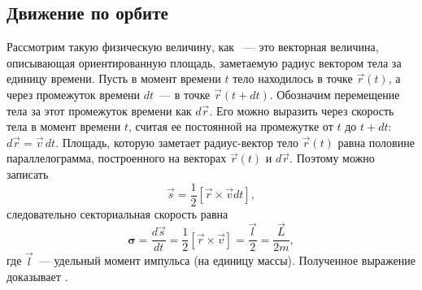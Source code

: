 \subsection{Движение по орбите}
\begin{figure}[t]
	\centering
	\caption{}
\end{figure}

Рассмотрим такую физическую величину, как ~--- это векторная величина, описывающая ориентированную площадь, заметаемую радиус вектором тела за единицу времени. Пусть в момент времени $t$ тело находилось в точке $\vec{r}(t)$, а через промежуток времени $dt$~--- в точке $\vec{r}(t + dt)$. Обозначим перемещение тела за этот промежуток времени как $d\vec{r}$. Его можно выразить через скорость тела в момент времени $t$, считая ее постоянной на промежутке от $t$ до $t + dt$: $d\vec{r} = \vec{v} \, dt$. Площадь, которую заметает радиус-вектор тело $\vec{r}(t)$ равна половине параллелограмма, построенного на векторах $\vec{r}(t)$ и $d\vec{r}$. Поэтому можно записать
\begin{equation*}
	\vec{s} = \frac{1}{2} [\vec{r} \times \vec{v} dt],
\end{equation*}
следовательно секториальная скорость равна
\begin{equation*}
	\boldsymbol{\sigma} = \frac{d \vec{s}}{dt} = \frac{1}{2} [\vec{r} \times \vec{v}] = \frac{\vec{l}}{2} = \frac{\vec{L}}{2m},
\end{equation*}
где $\vec{l}$~--- удельный момент импульса (на единицу массы). Полученное выражение доказывает .


